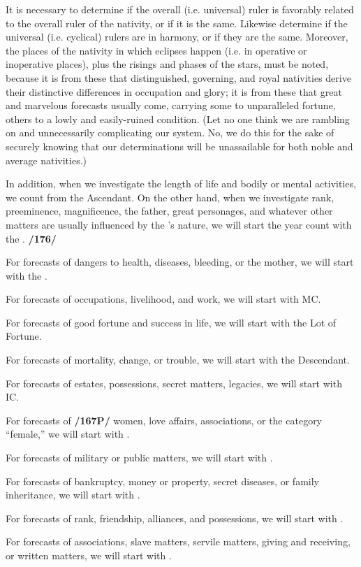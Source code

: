 It is necessary to determine if the overall (i.e. universal) ruler is favorably related to the overall ruler of the nativity, or if it is the same. Likewise determine if the universal (i.e. cyclical) rulers are in harmony, or if they are the same. Moreover, the places of the nativity in which eclipses happen (i.e. in operative or inoperative places), plus the risings and phases of the stars, must be noted, because it is from these that distinguished, governing, and royal nativities derive their distinctive differences in occupation and glory; it is from these that great and marvelous forecasts usually come, carrying some to unparalleled fortune, others to a lowly and easily-ruined condition. (Let no one think we are rambling on and unnecessarily complicating our system. No, we do this for
the sake of securely knowing that our determinations will be unassailable for both noble and average nativities.)

In addition, when we investigate the length of life and bodily or mental activities, we count from the Ascendant. On the other hand, when we investigate rank, preeminence, magnificence, the father, great personages, and whatever other matters are usually influenced by the \Sun’s nature, we will start the year count with the \Sun. \textbf{/176/} 

For forecasts of dangers to health, diseases, bleeding, or the mother, we will start with the \Moon. 

For forecasts of occupations, livelihood, and work, we will start with MC. 

For forecasts of good fortune and success in life, we will start with the Lot of Fortune. 

For forecasts of mortality, change, or trouble, we will start with the Descendant. 

For forecasts of estates, possessions, secret matters, legacies, we will start with IC. 

For forecasts of \textbf{/167P/} women, love affairs, associations, or the category “female,” we will start with \Venus. 

For forecasts of military or public matters, we will start with \Mars.

For forecasts of bankruptcy, money or property, secret diseases, or family inheritance, we will start with
\Saturn. 

For forecasts of rank, friendship, alliances, and possessions, we will start with \Jupiter. 

For forecasts of associations, slave matters, servile matters, giving and receiving, or written matters, we will start with \Mercury.

